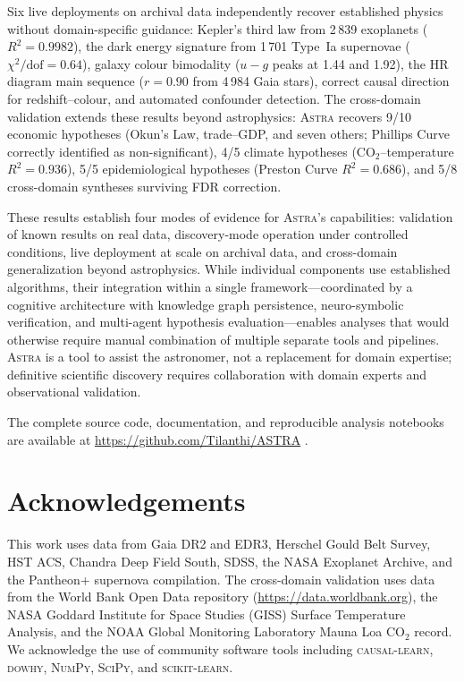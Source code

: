\documentclass[usenatbib]{rasti}
\newcommand{\astra}{\textsc{Astra}\xspace}
\begin{document}
Six live deployments on archival data independently recover established physics without domain-specific guidance: Kepler's third law from 2\,839 exoplanets ($R^{2}=0.9982$), the dark energy signature from 1\,701 Type~Ia supernovae ($\chi^{2}/\mathrm{dof}=0.64$), galaxy colour bimodality ($u{-}g$ peaks at 1.44 and 1.92), the HR diagram main sequence ($r=0.90$ from 4\,984 Gaia stars), correct causal direction for redshift--colour, and automated confounder detection.
The cross-domain validation extends these results beyond astrophysics: \astra recovers 9/10 economic hypotheses (Okun's Law, trade--GDP, and seven others; Phillips Curve correctly identified as non-significant), 4/5 climate hypotheses (CO$_{2}$--temperature $R^{2}=0.936$), 5/5 epidemiological hypotheses (Preston Curve $R^{2}=0.686$), and 5/8 cross-domain syntheses surviving FDR correction.

These results establish four modes of evidence for \astra's capabilities: validation of known results on real data, discovery-mode operation under controlled conditions, live deployment at scale on archival data, and cross-domain generalization beyond astrophysics.
While individual components use established algorithms, their integration within a single framework---coordinated by a cognitive architecture with knowledge graph persistence, neuro-symbolic verification, and multi-agent hypothesis evaluation---enables analyses that would otherwise require manual combination of multiple separate tools and pipelines.
\astra is a tool to assist the astronomer, not a replacement for domain expertise; definitive scientific discovery requires collaboration with domain experts and observational validation.

The complete source code, documentation, and reproducible analysis notebooks are available at \url{https://github.com/Tilanthi/ASTRA} \citep{White2026}.

\section*{Acknowledgements}

This work uses data from Gaia DR2 and EDR3, Herschel Gould Belt Survey, HST ACS, Chandra Deep Field South, SDSS, the NASA Exoplanet Archive, and the Pantheon+ supernova compilation.
The cross-domain validation uses data from the World Bank Open Data repository (\url{https://data.worldbank.org}), the NASA Goddard Institute for Space Studies (GISS) Surface Temperature Analysis, and the NOAA Global Monitoring Laboratory Mauna Loa CO$_{2}$ record.
We acknowledge the use of community software tools including \textsc{causal-learn}, \textsc{dowhy}, \textsc{NumPy}, \textsc{SciPy}, and \textsc{scikit-learn}.
\end{document}
